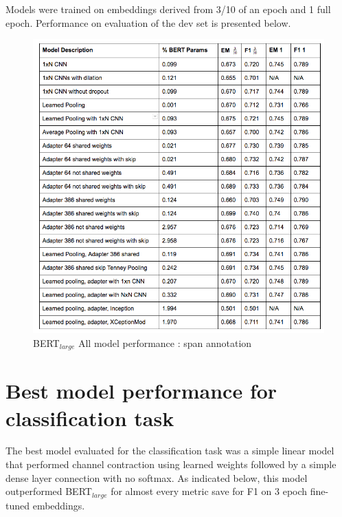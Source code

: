 Models were trained on embeddings derived from 3/10 of an epoch and 1 full epoch.  Performance on evaluation of the dev set is presented below.

\begin{figure}[h]
	\centering
	\includegraphics[width=\linewidth]{images/span/Span_Annotation_All_Model_Results.png}%
	\caption{BERT$_{large}$ All model performance : span annotation}
\end{figure}

\section{Best model performance for classification task}

The best model evaluated for the classification task was a simple linear model that performed channel contraction using learned weights followed by a simple dense layer connection with no softmax.  As indicated below, this model outperformed BERT$_{large}$ for almost every metric save for F1 on 3 epoch fine-tuned embeddings.

